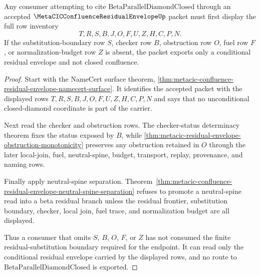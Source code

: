 \begin{theorem}
\label{thm:metacic-confluence-residual-envelope-closed-diamond-consumption}
Any consumer attempting to cite $\mathrm{BetaParallelDiamondClosed}$ through an accepted $\MetaCICConfluenceResidualEnvelopeUp$ packet must first display the full row inventory
$$
T,R,S,B,J,O,F,U,Z,H,C,P,N .
$$
If the substitution-boundary row $S$, checker row $B$, obstruction row $O$, fuel row $F$, or normalization-budget row $Z$ is absent, the packet exports only a conditional residual envelope and not closed confluence.
\end{theorem}
\begin{proof}
Start with the NameCert surface theorem, \autoref{thm:metacic-confluence-residual-envelope-namecert-surface}. It identifies the accepted packet with the displayed rows $T,R,S,B,J,O,F,U,Z,H,C,P,N$ and says that no unconditional closed-diamond coordinate is part of the carrier.

Next read the checker and obstruction rows. The checker-status determinacy theorem fixes the status exposed by $B$, while \autoref{thm:metacic-residual-envelope-obstruction-monotonicity} preserves any obstruction retained in $O$ through the later local-join, fuel, neutral-spine, budget, transport, replay, provenance, and naming rows.

Finally apply neutral-spine separation. Theorem~\ref{thm:metacic-confluence-residual-envelope-neutral-spine-separation} refuses to promote a neutral-spine read into a beta residual branch unless the residual frontier, substitution boundary, checker, local join, fuel trace, and normalization budget are all displayed.

Thus a consumer that omits $S$, $B$, $O$, $F$, or $Z$ has not consumed the finite residual-substitution boundary required for the endpoint. It can read only the conditional residual envelope carried by the displayed rows, and no route to $\mathrm{BetaParallelDiamondClosed}$ is exported.
\end{proof}

